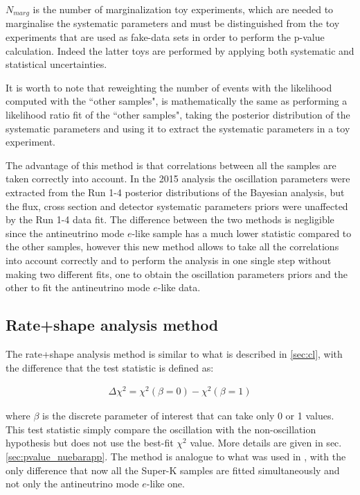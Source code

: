 $N_{marg}$ is the number of marginalization toy experiments, which are needed to marginalise the systematic parameters and 
must be distinguished from the toy experiments that are used as fake-data sets in order to perform the p-value calculation.
Indeed the latter toys are performed by applying both systematic and statistical uncertainties.

It is worth to note that reweighting the number of events with the likelihood computed with the ``other samples", 
is mathematically the same as performing a likelihood ratio fit of the ``other samples", taking the posterior distribution of the systematic parameters 
and using it to extract the systematic parameters in a toy experiment.

The advantage of this method is that correlations between all the samples are taken correctly into account.
In the 2015 analysis the oscillation parameters were extracted from the Run 1-4 posterior distributions of the Bayesian analysis,
but the flux, cross section and detector systematic parameters priors were unaffected by the Run 1-4 data fit.
The difference between the two methods is negligible since the antineutrino mode $e$-like sample has a much lower statistic 
compared to the other samples, however this new method allows to take all the correlations into account correctly and 
to perform the analysis in one single step without making two different fits, one to obtain the oscillation parameters priors and the other to fit the antineutrino mode $e$-like data.




\subsection{Rate+shape analysis method}
\label{sec:nuebarapp_rateshape}

The rate+shape analysis method is similar to what is described in \ref{sec:cl}, with 
the difference that the test statistic is defined as:
 
\begin{align}
\Delta \chi^2 = \chi^2(\beta=0) - \chi^2(\beta=1)
\end{align}

where $\beta$ is the discrete parameter of interest that can take only 0 or 1 values.
This test statistic simply compare the oscillation with the non-oscillation hypothesis
but does not use the best-fit $\chi^2$ value.
More details are given in sec.\ref{sec:pvalue_nuebarapp}.
The method is analogue to what was used in \cite{OurRun56AntiNueBarAppearanceAnalysis3Flavour},
with the only difference that now all the Super-K samples are fitted simultaneously
and not only the antineutrino mode $e$-like one.

